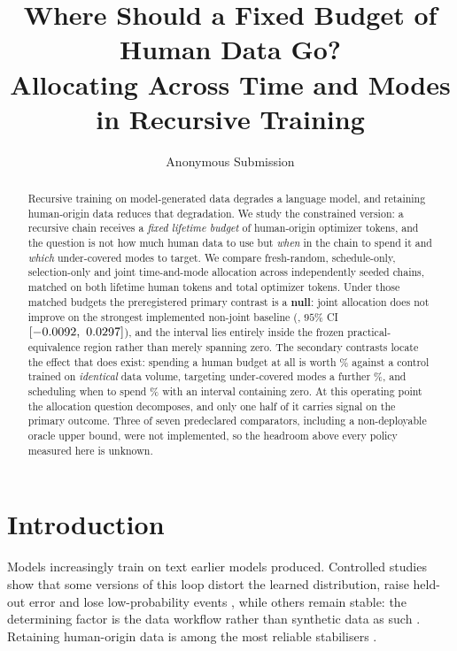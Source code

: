 \documentclass{article}
\title{Where Should a Fixed Budget of Human Data Go?\\
Allocating Across Time and Modes in Recursive Training}
\author{%
  Anonymous Submission\\
}
\begin{document}
\maketitle

\begin{abstract}
Recursive training on model-generated data degrades a language model, and retaining
human-origin data reduces that degradation. We study the constrained version: a recursive
chain receives a \emph{fixed lifetime budget} of human-origin optimizer tokens, and the
question is not how much human data to use but \emph{when} in the chain to spend it and
\emph{which} under-covered modes to target. We compare fresh-random, schedule-only,
selection-only and joint time-and-mode allocation across \PilotChains{} independently
seeded chains, matched on both lifetime human tokens and total optimizer tokens.
Under those matched budgets the preregistered primary contrast is a \textbf{null}: joint
allocation does not improve on the strongest implemented non-joint baseline
(\PilotPrimaryMean{}, $95\%$ CI $[\PilotPrimaryLow,\allowbreak\ \PilotPrimaryHigh]$), and the interval
lies entirely inside the frozen practical-equivalence region rather than merely spanning
zero. The secondary contrasts locate the effect that does exist: spending a human budget at
all is worth \PilotRandNonePct\% against a control trained on \emph{identical} data volume,
targeting under-covered modes a further \PilotSelRandPct\%, and scheduling when to spend
\PilotSchedRandPct\% with an interval containing zero. At this operating point the
allocation question decomposes, and only one half of it carries signal on the primary
outcome. Three of seven predeclared comparators, including a non-deployable oracle upper
bound, were not implemented, so the headroom above every policy measured here is unknown.
\end{abstract}

\section{Introduction}
\label{sec:intro}

Models increasingly train on text earlier models produced. Controlled studies show that
some versions of this loop distort the learned distribution, raise held-out error and lose
low-probability events \cite{shumailov2024collapse,alemohammad2024mad,dohmatob2024tails},
while others remain stable: the determining factor is the data workflow rather than
synthetic data as such \cite{gerstgrasser2024inevitable,kazdan2025collapse}. Retaining
human-origin data is among the most reliable stabilisers
\cite{gerstgrasser2024inevitable,seddik2024synthetic}.
\end{document}
